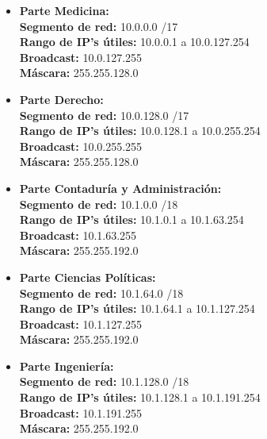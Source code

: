 \begin{itemize}[leftmargin=*]
    \item \textbf{Parte Medicina:} \\
    \textbf{Segmento de red:} 10.0.0.0 /17 \\
    \textbf{Rango de IP's útiles:} 10.0.0.1 a 10.0.127.254 \\
    \textbf{Broadcast:} 10.0.127.255 \\
    \textbf{Máscara:} 255.255.128.0 
    \vspace{5pt}

    \item \textbf{Parte Derecho:} \\
    \textbf{Segmento de red:} 10.0.128.0 /17 \\
    \textbf{Rango de IP's útiles:} 10.0.128.1 a 10.0.255.254 \\
    \textbf{Broadcast:} 10.0.255.255 \\
    \textbf{Máscara:} 255.255.128.0 
    \vspace{5pt}

    \item \textbf{Parte Contaduría y Administración:} \\
    \textbf{Segmento de red:} 10.1.0.0 /18 \\
    \textbf{Rango de IP's útiles:} 10.1.0.1 a 10.1.63.254 \\
    \textbf{Broadcast:} 10.1.63.255 \\
    \textbf{Máscara:} 255.255.192.0 
    \vspace{5pt}

    \item \textbf{Parte Ciencias Políticas:} \\
    \textbf{Segmento de red:} 10.1.64.0 /18 \\
    \textbf{Rango de IP's útiles:} 10.1.64.1 a 10.1.127.254 \\
    \textbf{Broadcast:} 10.1.127.255 \\
    \textbf{Máscara:} 255.255.192.0 
    \vspace{5pt}

    \item \textbf{Parte Ingeniería:} \\
    \textbf{Segmento de red:} 10.1.128.0 /18 \\
    \textbf{Rango de IP's útiles:} 10.1.128.1 a 10.1.191.254 \\
    \textbf{Broadcast:} 10.1.191.255 \\
    \textbf{Máscara:} 255.255.192.0 
    \vspace{5pt}


\end{itemize}
